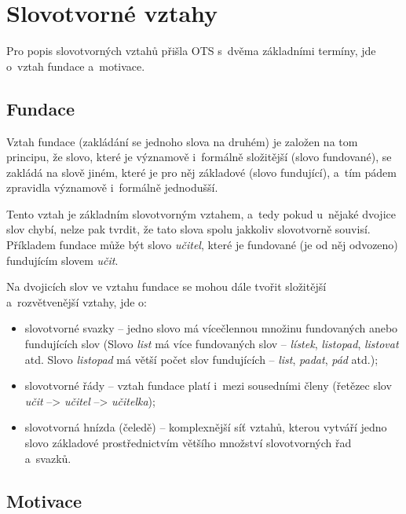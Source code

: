\hypertarget{slovotvornuxe9-vztahy}{%
\section{Slovotvorné vztahy}\label{slovotvornuxe9-vztahy}}

Pro popis slovotvorných vztahů přišla OTS s~dvěma základními termíny,
jde o~vztah fundace a~motivace.

\hypertarget{fundace}{%
\subsection{Fundace}\label{fundace}}

Vztah fundace (zakládání se jednoho slova na druhém) je založen na tom
principu, že slovo, které je významově i~formálně složitější (slovo
fundované), se zakládá na slově jiném, které je pro něj základové (slovo
fundující), a~tím pádem zpravidla významově i~formálně jednodušší.
\parencite[95]{dokulil00}

Tento vztah je základním slovotvorným vztahem, a~tedy pokud u~nějaké
dvojice slov chybí, nelze pak tvrdit, že tato slova spolu jakkoliv
slovotvorně souvisí. Příkladem fundace může být slovo \emph{učitel},
které je fundované (je od něj odvozeno) fundujícím slovem \emph{učit}.

Na dvojicích slov ve vztahu fundace se mohou dále tvořit složitější
a~rozvětvenější vztahy, jde o:

\begin{itemize}
\tightlist
\item
  slovotvorné svazky -- jedno slovo má vícečlennou množinu fundovaných
  anebo fundujících slov (Slovo \emph{list} má více fundovaných slov --
  \emph{lístek}, \emph{listopad}, \emph{listovat} atd. Slovo
  \emph{listopad} má větší počet slov fundujících -- \emph{list},
  \emph{padat}, \emph{pád} atd.);
\item
  slovotvorné řády -- vztah fundace platí i~mezi sousedními členy
  (řetězec slov \emph{učit} --\textgreater{} \emph{učitel}
  --\textgreater{} \emph{učitelka});
\item
  slovotvorná hnízda (čeledě) -- komplexnější síť vztahů, kterou vytváří
  jedno slovo základové prostřednictvím většího množství slovotvorných
  řad a~svazků.~\parencite[12--13]{dokulil62}
\end{itemize}

\hypertarget{motivace}{%
\subsection{Motivace}\label{motivace}}

